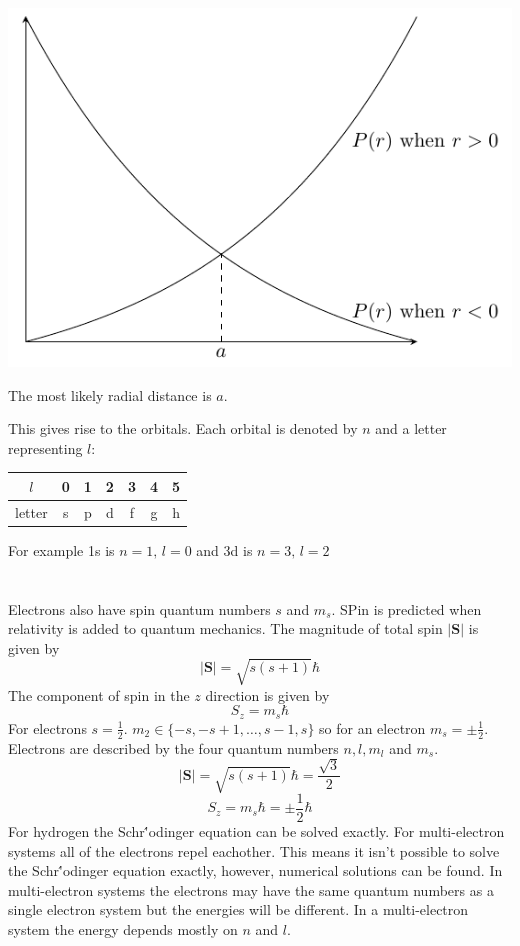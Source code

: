\documentclass{article}
\renewcommand{\vec}[1]{\bm{#1}}
\newcommand{\vv}[1]{\vec{#1}}
\newcommand{\hb}{\hbar}
\begin{document}
\begin{center}
\includegraphics[scale=0.4]{RadialProbabilityDistribution}
\end{center}
The most likely radial distance is \(a\).

This gives rise to the orbitals. Each orbital is denoted by \(n\) and a letter representing \(l\):

\begin{center}
\begin{tabular}{|c|cccccc|}\hline
\(l\) & 0 & 1 & 2 & 3 & 4 & 5\\\hline
letter& s & p & d & f & g & h\\\hline
\end{tabular}
\end{center}
For example 1s is \(n=1,\,l=0\) and 3d is \(n=3,\,l=2\)


\section{}

Electrons also have spin quantum numbers \(s\) and \(m_s\). SPin is predicted when relativity is added to quantum mechanics. The magnitude of total spin \(|\vv S|\) is given by
\[|\vv S|=\sqrt{s(s+1)}\hb\]
The component of spin in the \(z\) direction is given by
\[S_z=m_s\hb\]
For electrons \(s=\frac12\). \(m_2\in\{-s,-s+1,\dots ,s-1,s\}\) so for an electron \(m_s=\pm\frac12\). Electrons are described by the four quantum numbers \(n,l,m_l\) and \(m_s\).
\[|\vv S|=\sqrt{s(s+1)}\hb=\frac{\sqrt{3}}{2}\]
\[S_z=m_s\hb=\pm\frac12\hb\]
For hydrogen the Schr\''odinger equation can be solved exactly. For multi-electron systems all of the electrons repel eachother. This means it isn't possible to solve the Schr\''odinger equation exactly, however, numerical solutions can be found. In multi-electron systems the electrons may have the same quantum numbers as a single electron system but the energies will be different. In a multi-electron system the energy depends mostly on \(n\) and \(l\).
\end{document}
